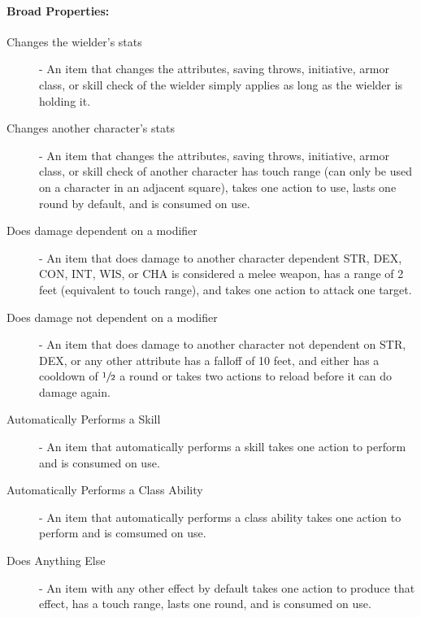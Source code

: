 \paragraph{Broad Properties:}
\begin{description}
	\item[Changes the wielder's stats]
	
	- An item that changes the attributes, saving throws, initiative, armor class, or skill check of the wielder simply applies as long as the wielder is holding it.
	
	\item[Changes another character's stats] 
	
	- An item that changes the attributes, saving throws, initiative, armor class, or skill check of another character has touch range (can only be used on a character in an adjacent square), takes one action to use, lasts one round by default, and is consumed on use.
	
	\item[Does damage dependent on a modifier]
	
	- An item that does damage to another character dependent STR, DEX, CON, INT, WIS, or CHA is considered a melee weapon, has a range of 2 feet (equivalent to touch range), and takes one action to attack one target.
	
	\item[Does damage not dependent on a modifier]
	
	- An item that does damage to another character not dependent on STR, DEX, or any other attribute has a falloff of 10 feet, and either has a cooldown of $\sfrac{1}{2}$ a round or takes two actions to reload before it can do damage again.
	
	\item[Automatically Performs a Skill]
	
	- An item that automatically performs a skill takes one action to perform and is consumed on use.
	
	\item[Automatically Performs a Class Ability]
	
	- An item that automatically performs a class ability takes one action to perform and is comsumed on use.
	
	\item[Does Anything Else]
	
	- An item with any other effect by default takes one action to produce that effect, has a touch range, lasts one round, and is consumed on use.
\end{description}

